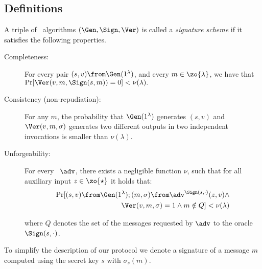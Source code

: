 \subsection{Definitions}\label{se:moredefinitions}

\begin{definition}\label{def:signature} A triple of \ppt\ algorithms $(\Gen,\Sign,\Ver)$
is called a {\em signature scheme} if it satisfies the following properties.

\begin{description}

\item[Completeness:] For every pair $(s,v) \from \Gen(1^\lambda)$,
    and every $m \in \zo{\lambda}$, we have that $\Pr[\Ver(v, m,\Sign(s, m))=0]<\nu(\lambda).$
\item[Consistency (non-repudiation):] For any $m$, the probability that $\Gen(1^\lambda)$ generates $(s,v)$
and $\Ver(v,m,\sigma)$ generates two different outputs in two independent invocations is smaller than $\nu(\lambda)$.


\item[Unforgeability:] For every \ppt\ $\adv$, there exists a negligible function $\nu$,  such that for all auxiliary input $z\in \zo{\star}$ it holds that:
	\begin{equation*}\begin{split}
\Pr[(s,v) \from \Gen(1^\lambda); (m,\sigma)\from\adv^{\Sign(s,\cdot)}(z,v) \wedge \\
  \Ver(v,m,\sigma)=1 \wedge m \notin Q] < \nu(\lambda)
	\end{split}\end{equation*}
	
where $Q$ denotes the set of the messages requested by $\adv$ to the oracle $\Sign(s,\cdot)$.
\end{description}
 \end{definition}
 To simplify the description of our protocol we denote a signature of a message $m$ computed using the secret key $s$ with $\sigma_s(m)$.
 
